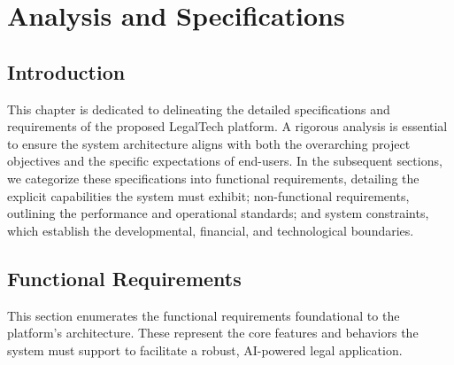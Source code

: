 \chapter{Analysis and Specifications}
\label{chap:Analysis_and_Specifications}

\section*{Introduction}
This chapter is dedicated to delineating the detailed specifications and requirements of the proposed LegalTech platform. A rigorous analysis is essential to ensure the system architecture aligns with both the overarching project objectives and the specific expectations of end-users. In the subsequent sections, we categorize these specifications into functional requirements, detailing the explicit capabilities the system must exhibit; non-functional requirements, outlining the performance and operational standards; and system constraints, which establish the developmental, financial, and technological boundaries.

\newpage

\section{Functional Requirements}
This section enumerates the functional requirements foundational to the platform's architecture. These represent the core features and behaviors the system must support to facilitate a robust, AI-powered legal application.

